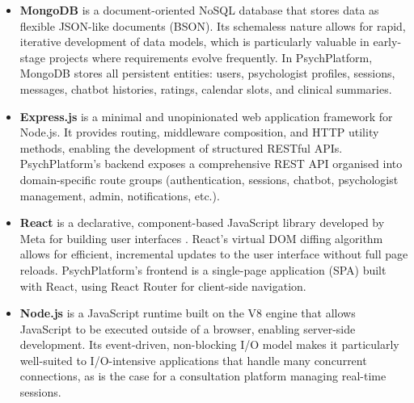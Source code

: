 \begin{itemize}[leftmargin=1.5em, itemsep=4pt]

  \item \textbf{MongoDB} is a document-oriented NoSQL database that stores data
        as flexible JSON-like documents (BSON). Its schemaless nature allows for
        rapid, iterative development of data models, which is particularly
        valuable in early-stage projects where requirements evolve frequently.
        In PsychPlatform, MongoDB stores all persistent entities: users,
        psychologist profiles, sessions, messages, chatbot histories, ratings,
        calendar slots, and clinical summaries.

  \item \textbf{Express.js} is a minimal and unopinionated web application
        framework for Node.js. It provides routing, middleware composition, and
        HTTP utility methods, enabling the development of structured RESTful
        APIs. PsychPlatform's backend exposes a comprehensive REST API organised
        into domain-specific route groups (authentication, sessions, chatbot,
        psychologist management, admin, notifications, etc.).

  \item \textbf{React} is a declarative, component-based JavaScript library
        developed by Meta for building user interfaces \cite{Fedosejev2015}.
        React's virtual DOM diffing algorithm allows for efficient, incremental
        updates to the user interface without full page reloads. PsychPlatform's
        frontend is a single-page application (SPA) built with React, using
        React Router for client-side navigation.

  \item \textbf{Node.js} is a JavaScript runtime built on the V8 engine that
        allows JavaScript to be executed outside of a browser, enabling
        server-side development. Its event-driven, non-blocking I/O model makes
        it particularly well-suited to I/O-intensive applications that handle
        many concurrent connections, as is the case for a consultation platform
        managing real-time sessions.

\end{itemize}

